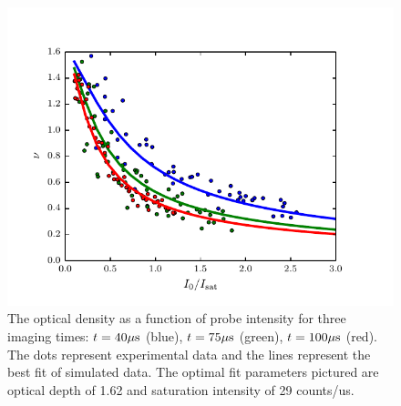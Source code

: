 \documentclass[12pt]{iopart}
\begin{document}
\begin{figure}
	\includegraphics{figure8.pdf}
\caption{The optical density as a function of probe intensity for three imaging times: $t=40\mu \rm{s}$ (blue),  $t=75\mu \rm{s}$ (green),  $t=100\mu \rm{s}$ (red). The dots represent experimental data and the lines represent the best fit of simulated data. The optimal fit parameters pictured are optical depth of 1.62 and saturation intensity of 29 counts/us. }  
\label{fig:isatCalib}
\end{figure}
\end{document}
